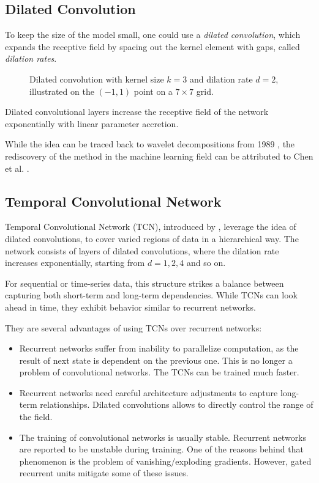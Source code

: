 \subsection{Dilated Convolution}

To keep the size of the model small, one could use a \emph{dilated convolution}, which expands the receptive field by spacing out the kernel element with gaps, called \emph{dilation rates}.

\begin{figure}[ht!]
\centering

\caption[Dilated convolution.]{Dilated convolution with kernel size $k = 3$ and dilation rate $d = 2$, illustrated on the $(-1, 1)$ point on a $7 \times 7$ grid.}
\end{figure}

Dilated convolutional layers increase the receptive field of the network exponentially with linear parameter accretion. 

While the idea can be traced back to wavelet decompositions from 1989 \cite{Holschneider1989}, the rediscovery of the method in the machine learning field can be attributed to Chen et al. \cite{Chen2015}.

\subsection{Temporal Convolutional Network}

Temporal Convolutional Network (TCN), introduced by \cite{Colin2016}, leverage the idea of dilated convolutions, to cover varied regions of data in a hierarchical way. The network consists of layers of dilated convolutions, where the dilation rate increases exponentially, starting from $d = 1, 2, 4$ and so on.

For sequential or time-series data, this structure strikes a balance between capturing both short-term and long-term dependencies. While TCNs can look ahead in time, they exhibit behavior similar to recurrent networks.

They are several advantages of using TCNs over recurrent networks: \begin{itemize}
	\item Recurrent networks suffer from inability to parallelize computation, as the result of next state is dependent on the previous one. This is no longer a problem of convolutional networks. The TCNs can be trained much faster.
	\item Recurrent networks need careful architecture adjustments to capture long-term relationships. Dilated convolutions allows to directly control the range of the field.
	\item The training of convolutional networks is usually stable. Recurrent networks are reported to be unstable during training. One of the reasons behind that phenomenon is the problem of vanishing/exploding gradients. However, gated recurrent units mitigate some of these issues. 
\end{itemize}


